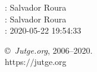 \documentclass[11pt]{article}
\begin{document}
    \newcommand{\SampleTwoCol}{\SampleTwoColInputOutput{sample-1}{1}\SampleTwoColInputOutput{sample-2}{2}}
    \newcommand{\SampleOneCol}{\SampleOneColInputOutput{sample-1}{1}\SampleOneColInputOutput{sample-2}{2}}

    \ProblemInformation
    \Author: Salvador Roura\\    \Translator: Salvador Roura\\
    \Generation: 2020-05-22 19:54:33

    \bigskip

    \copyright\ \emph{Jutge.org}, 2006--2020. \\
    https:$/\!\!/$jutge.org
\end{document}
